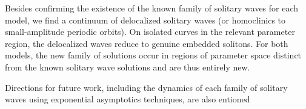 Besides confirming
the existence of the known family of solitary waves for each model,
we find a continuum of delocalized solitary waves
(or homoclinics to small-amplitude periodic orbits).
On isolated curves in the relevant parameter region, the delocalized
waves reduce to genuine embedded solitons.
For both models, the new family of solutions occur in regions of
parameter space distinct from the known solitary wave solutions and
are thus entirely new.

Directions for future work, including the dynamics of each family of
solitary waves using exponential asymptotics techniques, are also entioned

